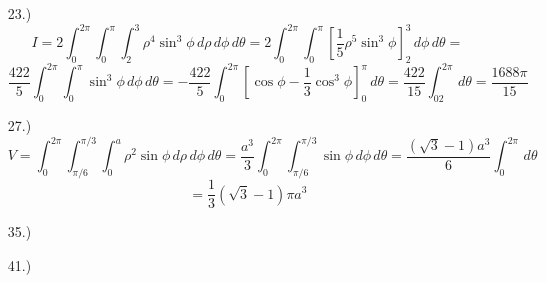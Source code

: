 \documentclass[12pt]{article}
\newcommand{\bracks}[1]{\left[#1\right]}
\begin{document}
\begin{itemize}
    \item [23.)] \[I=2\int^{2\pi}_0\int^\pi_0\int^3_2\rho^4\sin^3\phi\,d\rho\,d\phi\,d\theta=2\int^{2\pi}_0\int^\pi_0\bracks{\frac{1}{5}\rho^5\sin^3\phi}^3_2\,d\phi\,d\theta=\]
    \[\frac{422}{5}\int^{2\pi}_0\int^\pi_0\sin^3\phi\,d\phi\,d\theta=-\frac{422}{5}\int^{2\pi}_0\bracks{\cos\phi-\frac{1}{3}\cos^3\phi}^\pi_0\,d\theta=\frac{422}{15}\int^{2\pi}_02\,d\theta=\frac{1688\pi}{15}\]

    \item [27.)] \[V=\int^{2\pi}_0\int^{\pi/3}_{\pi/6}\int^a_0\rho^2\sin\phi\,d\rho\,d\phi\,d\theta=\frac{a^3}{3}\int^{2\pi}_0\int^{\pi/3}_{\pi/6}\sin\phi\,d\phi\,d\theta=\frac{(\sqrt3-1)a^3}{6}\int^{2\pi}_0\,d\theta\]
    \[=\frac{1}{3}(\sqrt3-1)\pi a^3\]

    \item [35.)] 

    \item [41.)] 
\end{itemize}
\end{document}
